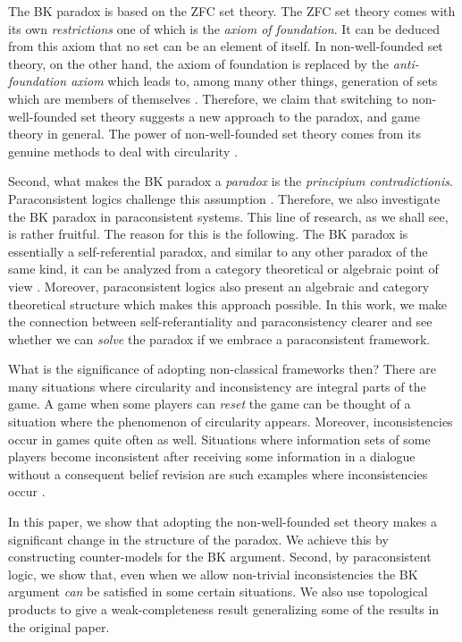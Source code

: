 \documentclass{article}
\begin{document}
The BK paradox is based on the ZFC set theory. The ZFC set theory comes with its own \emph{restrictions} one of which is the \emph{axiom of foundation}. It can be deduced from this axiom that no set can be an element of itself. In non-well-founded set theory, on the other hand, the axiom of foundation is replaced by the \emph{anti-foundation axiom} which leads to, among many other things, generation of sets which are members of themselves \cite{mir,acz}. Therefore, we claim that switching to non-well-founded set theory suggests a new approach to the paradox, and game theory in general. The power of non-well-founded set theory comes from its genuine methods to deal with circularity \cite{bar1,moss0}.

Second, what makes the BK paradox a \emph{paradox} is the \emph{principium contradictionis}. Paraconsistent logics challenge this assumption \cite{pri1,pri}. Therefore, we also investigate the BK paradox in paraconsistent systems. This line of research, as we shall see, is rather fruitful.  The reason for this is the following. The BK paradox is essentially a self-referential paradox, and similar to any other paradox of the same kind, it can be analyzed from a category theoretical or algebraic point of view \cite{yan,abr0}. Moreover, paraconsistent logics also present an algebraic and category theoretical structure which makes this approach possible. In this work, we make the connection between self-referantiality and paraconsistency clearer and see whether we can \emph{solve} the paradox if we embrace a paraconsistent framework.

What is the significance of adopting non-classical frameworks then? There are many situations where circularity and inconsistency are integral parts of the game. A game when some players can \emph{reset} the game can be thought of a situation where the phenomenon of circularity appears. Moreover, inconsistencies occur in games quite often as well. Situations where information sets of some players become inconsistent after receiving some information in a dialogue without a consequent belief revision are such examples where inconsistencies occur \cite{leb,rah}. 

In this paper, we show that adopting the non-well-founded set theory makes a significant change in the structure of the paradox. We achieve this by constructing counter-models for the BK argument. Second, by paraconsistent logic, we show that, even when we allow non-trivial inconsistencies the BK argument \emph{can} be satisfied in some certain situations. We also use topological products to give a weak-completeness result generalizing some of the results in the original paper.
\end{document}
